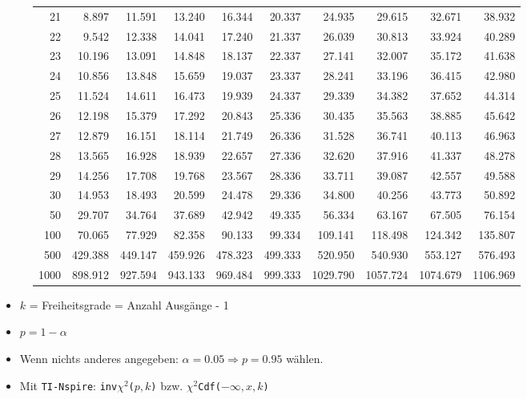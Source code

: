 \begin{figure}[h!]
\begin{center}
\begin{tabular}{|r|rrr|rrr|rrr|}
21&8.897&11.591&13.240&16.344&20.337&24.935&29.615&32.671&38.932\\
22&9.542&12.338&14.041&17.240&21.337&26.039&30.813&33.924&40.289\\
23&10.196&13.091&14.848&18.137&22.337&27.141&32.007&35.172&41.638\\
24&10.856&13.848&15.659&19.037&23.337&28.241&33.196&36.415&42.980\\
25&11.524&14.611&16.473&19.939&24.337&29.339&34.382&37.652&44.314\\
26&12.198&15.379&17.292&20.843&25.336&30.435&35.563&38.885&45.642\\
27&12.879&16.151&18.114&21.749&26.336&31.528&36.741&40.113&46.963\\
28&13.565&16.928&18.939&22.657&27.336&32.620&37.916&41.337&48.278\\
29&14.256&17.708&19.768&23.567&28.336&33.711&39.087&42.557&49.588\\
30&14.953&18.493&20.599&24.478&29.336&34.800&40.256&43.773&50.892\\
50&29.707&34.764&37.689&42.942&49.335&56.334&63.167&67.505&76.154\\
100&70.065&77.929&82.358&90.133&99.334&109.141&118.498&124.342&135.807\\
500&429.388&449.147&459.926&478.323&499.333&520.950&540.930&553.127&576.493\\
1000&898.912&927.594&943.133&969.484&999.333&1029.790&1057.724&1074.679&1106.969\\
\hline
\end{tabular}
\end{center}
\end{figure}

\begin{itemize}
  \item $k$ = Freiheitsgrade = Anzahl Ausgänge - 1
  \item $p = 1 - \alpha$
  \item Wenn nichts anderes angegeben:
    $\alpha = 0.05 \Rightarrow p = 0.95$ wählen.
    \item Mit \texttt{TI-Nspire}: \texttt{inv$\chi^2$($p,k$)} bzw. \texttt{$\chi^2$Cdf($-\infty,x,k$)}
\end{itemize}

\pagebreak
